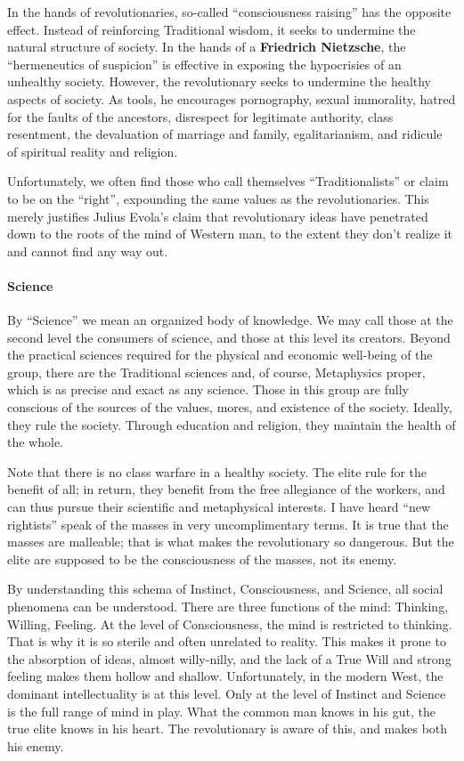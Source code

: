 In the hands of revolutionaries, so-called ``consciousness raising'' has the opposite effect. Instead of reinforcing Traditional wisdom, it seeks to undermine the natural structure of society. In the hands of a \textbf{Friedrich Nietzsche}, the ``hermeneutics of suspicion'' is effective in exposing the hypocrisies of an unhealthy society. However, the revolutionary seeks to undermine the healthy aspects of society. As tools, he encourages pornography, sexual immorality, hatred for the faults of the ancestors, disrespect for legitimate authority, class resentment, the devaluation of marriage and family, egalitarianism, and ridicule of spiritual reality and religion.

Unfortunately, we often find those who call themselves ``Traditionalists'' or claim to be on the ``right'', expounding the same values as the revolutionaries. This merely justifies Julius Evola's claim that revolutionary ideas have penetrated down to the roots of the mind of Western man, to the extent they don't realize it and cannot find any way out.

\paragraph{Science}


By ``Science'' we mean an organized body of knowledge. We may call those at the second level the consumers of science, and those at this level its creators. Beyond the practical sciences required for the physical and economic well-being of the group, there are the Traditional sciences and, of course, Metaphysics proper, which is as precise and exact as any science. Those in this group are fully conscious of the sources of the values, mores, and existence of the society. Ideally, they rule the society. Through education and religion, they maintain the health of the whole.

Note that there is no class warfare in a healthy society. The elite rule for the benefit of all; in return, they benefit from the free allegiance of the workers, and can thus pursue their scientific and metaphysical interests. I have heard ``new rightists'' speak of the masses in very uncomplimentary terms. It is true that the masses are malleable; that is what makes the revolutionary so dangerous. But the elite are supposed to be the consciousness of the masses, not its enemy.

By understanding this schema of Instinct, Consciousness, and Science, all social phenomena can be understood. There are three functions of the mind: Thinking, Willing, Feeling. At the level of Consciousness, the mind is restricted to thinking. That is why it is so sterile and often unrelated to reality. This makes it prone to the absorption of ideas, almost willy-nilly, and the lack of a True Will and strong feeling makes them hollow and shallow. Unfortunately, in the modern West, the dominant intellectuality is at this level. Only at the level of Instinct and Science is the full range of mind in play. What the common man knows in his gut, the true elite knows in his heart. The revolutionary is aware of this, and makes both his enemy.



